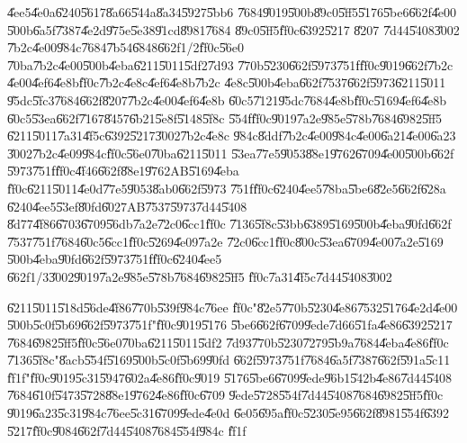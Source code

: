 \documentclass{article}
\begin{document}
\U{4ee5}\U{4e0a}\U{6240}\U{5617}\U{8a66}\U{544a}\U{8a34}\U{5927}\U{5bb6}%
\U{7684}\U{9019}\U{500b}\U{89c0}\U{5ff5}\U{5176}\U{5be6}\U{662f}\U{4e00}%
\U{500b}\U{6a5f}\U{7387}\U{4e2d}\U{975e}\U{5e38}\U{91cd}\U{8981}\U{7684}%
\U{89c0}\U{5ff5}\U{ff0c}\U{6392}\U{5217} \U{8207} \U{7d44}\U{5408}\U{3002}%
\U{7b2c}\U{4e00}\U{984c}\U{7684}\U{7b54}\U{6848}\U{662f}1/2\U{ff0c}\U{56e0}%
\U{70ba}\U{7b2c}\U{4e00}\U{500b}\U{4eba}\U{6211}\U{5011}\U{5df2}\U{7d93}%
\U{770b}\U{5230}\U{662f}\U{5973}\U{751f}\U{ff0c}\U{9019}\U{662f}\U{7b2c}%
\U{4e00}\U{4ef6}\U{4e8b}\U{ff0c}\U{7b2c}\U{4e8c}\U{4ef6}\U{4e8b}\U{7b2c}%
\U{4e8c}\U{500b}\U{4eba}\U{662f}\U{7537}\U{662f}\U{5973}\U{6211}\U{5011}%
\U{95dc}\U{5fc3}\U{7684}\U{662f}\U{8207}\U{7b2c}\U{4e00}\U{4ef6}\U{4e8b}%
\U{60c5}\U{7121}\U{95dc}\U{7684}\U{4e8b}\U{ff0c}\U{5169}\U{4ef6}\U{4e8b}%
\U{60c5}\U{53ea}\U{662f}\U{7167}\U{8457}\U{6b21}\U{5e8f}\U{5148}\U{5f8c}%
\U{554f}\U{ff0c}\U{9019}\U{7a2e}\U{985e}\U{578b}\U{7684}\U{6982}\U{5ff5}%
\U{6211}\U{5011}\U{7a31}\U{4f5c}\U{6392}\U{5217}\U{3002}\U{7b2c}\U{4e8c}%
\U{984c}\U{8ddf}\U{7b2c}\U{4e00}\U{984c}\U{4e00}\U{6a21}\U{4e00}\U{6a23}%
\U{3002}\U{7b2c}\U{4e09}\U{984c}\U{ff0c}\U{56e0}\U{70ba}\U{6211}\U{5011}%
\U{53ea}\U{77e5}\U{9053}\U{88e1}\U{9762}\U{6709}\U{4e00}\U{500b}\U{662f}%
\U{5973}\U{751f}\U{ff0c}\U{4f46}\U{662f}\U{88e1}\U{9762}AB\U{5169}\U{4eba}%
\U{ff0c}\U{6211}\U{5011}\U{4e0d}\U{77e5}\U{9053}\U{8ab0}\U{662f}\U{5973}%
\U{751f}\U{ff0c}\U{6240}\U{4ee5}\U{78ba}\U{5be6}\U{82e5}\U{662f}\U{628a}%
\U{6240}\U{4ee5}\U{53ef}\U{80fd}\U{6027}AB\U{7537}\U{5973}\U{7d44}\U{5408}%
\U{8d77}\U{4f86}\U{6703}\U{6709}\U{56db}\U{7a2e}\U{72c0}\U{6cc1}\U{ff0c}%
\U{7136}\U{5f8c}\U{53bb}\U{6389}\U{5169}\U{500b}\U{4eba}\U{90fd}\U{662f}%
\U{7537}\U{751f}\U{7684}\U{60c5}\U{6cc1}\U{ff0c}\U{5269}\U{4e09}\U{7a2e}%
\U{72c0}\U{6cc1}\U{ff0c}\U{800c}\U{53ea}\U{6709}\U{4e00}\U{7a2e}\U{5169}%
\U{500b}\U{4eba}\U{90fd}\U{662f}\U{5973}\U{751f}\U{ff0c}\U{6240}\U{4ee5}%
\U{662f}1/3\U{3002}\U{9019}\U{7a2e}\U{985e}\U{578b}\U{7684}\U{6982}\U{5ff5}%
\U{ff0c}\U{7a31}\U{4f5c}\U{7d44}\U{5408}\U{3002}

\bigskip

\U{6211}\U{5011}\U{518d}\U{56de}\U{4f86}\U{770b}\U{539f}\U{984c}\U{76ee}%
\U{ff0c}"\U{82e5}\U{770b}\U{5230}\U{4e86}\U{7532}\U{5176}\U{4e2d}\U{4e00}%
\U{500b}\U{5c0f}\U{5b69}\U{662f}\U{5973}\U{751f}"\U{ff0c}\U{9019}\U{5176}%
\U{5be6}\U{662f}\U{6709}\U{9ede}\U{7d66}\U{51fa}\U{4e86}\U{6392}\U{5217}%
\U{7684}\U{6982}\U{5ff5}\U{ff0c}\U{56e0}\U{70ba}\U{6211}\U{5011}\U{5df2}%
\U{7d93}\U{770b}\U{5230}\U{7279}\U{5b9a}\U{7684}\U{4eba}\U{4e86}\U{ff0c}%
\U{7136}\U{5f8c}"\U{8acb}\U{554f}\U{5169}\U{500b}\U{5c0f}\U{5b69}\U{90fd}%
\U{662f}\U{5973}\U{751f}\U{7684}\U{6a5f}\U{7387}\U{662f}\U{591a}\U{5c11}%
\U{ff1f}"\U{ff0c}\U{9019}\U{5c31}\U{5947}\U{602a}\U{4e86}\U{ff0c}\U{9019}%
\U{5176}\U{5be6}\U{6709}\U{9ede}\U{96b1}\U{542b}\U{4e86}\U{7d44}\U{5408}%
\U{7684}\U{610f}\U{5473}\U{5728}\U{88e1}\U{9762}\U{4e86}\U{ff0c}\U{6709}%
\U{9ede}\U{5728}\U{554f}\U{7d44}\U{5408}\U{7684}\U{6982}\U{5ff5}\U{ff0c}%
\U{9019}\U{6a23}\U{5c31}\U{984c}\U{76ee}\U{5c31}\U{6709}\U{9ede}\U{4e0d}%
\U{6e05}\U{695a}\U{ff0c}\U{5230}\U{5e95}\U{662f}\U{8981}\U{554f}\U{6392}%
\U{5217}\U{ff0c}\U{9084}\U{662f}\U{7d44}\U{5408}\U{7684}\U{554f}\U{984c}%
\U{ff1f}
\end{document}
